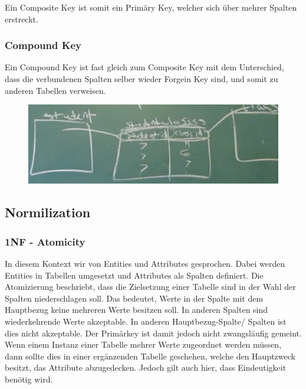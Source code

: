 Ein Composite Key ist somit ein Primäry Key, welcher sich über mehrer Spalten erstreckt.

\subsubsection{Compound Key}
Ein Compound Key ist fast gleich zum Composite Key mit dem Unterschied, dass die verbundenen Spalten selber wieder Forgein Key sind, und somit zu anderen Tabellen verweisen.

\begin{figure}[H]
	\centering
	\includegraphics[scale = 0.3]{attachment/chapter_3/Scc032}
	\caption{}
	\label{fig:Scc032}
\end{figure}

\subsection{Normilization}
\subsubsection{1NF - Atomicity}
In diesem Kontext wir von Entities und Attributes gesprochen. Dabei werden Entities in Tabellen umgesetzt und Attributes als Spalten definiert. 
Die Atomizierung beschriebt, dass die Zielsetzung einer Tabelle sind in der Wahl der Spalten niederschlagen soll. Das bedeutet, Werte in der Spalte mit dem Hauptbezug keine mehreren Werte besitzen soll. In anderen Spalten sind wiederkehrende Werte akzeptable. In anderen Hauptbezug-Spalte/ Spalten ist dies nicht akzeptable. Der Primärkey ist damit jedoch nicht zwangsläufig gemeint.\\

Wenn einem Instanz einer Tabelle mehrer Werte zugeordnet werden müssen, dann sollte dies in einer ergänzenden Tabelle geschehen, welche den Hauptzweck besitzt, das Attribute abzugedecken. Jedoch gilt auch hier, dass Eindeutigkeit benötig wird. 

